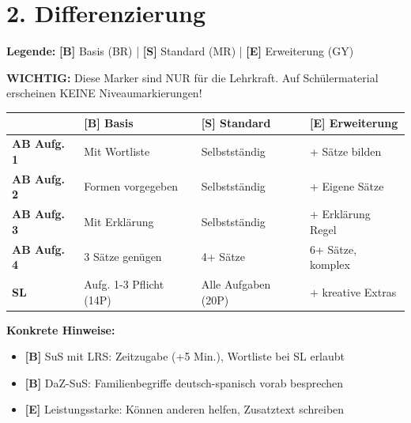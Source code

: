 \documentclass[11pt, a4paper]{article}
\newcommand{\B}{\textcolor{basis}{\textbf{[B]}}}
\newcommand{\Std}{\textcolor{standard}{\textbf{[S]}}}
\newcommand{\E}{\textcolor{erweiterung}{\textbf{[E]}}}
\begin{document}

\section*{2. Differenzierung}

\begin{differenzierung}
\textbf{Legende:} \B{} Basis (BR) | \Std{} Standard (MR) | \E{} Erweiterung (GY)

\vspace{0.5em}

\textbf{WICHTIG:} Diese Marker sind NUR für die Lehrkraft. Auf Schülermaterial erscheinen KEINE Niveaumarkierungen!
\end{differenzierung}

\vspace{1em}

\begin{tabularx}{\textwidth}{|l|X|X|X|}
\hline
& \B{} \textbf{Basis} & \Std{} \textbf{Standard} & \E{} \textbf{Erweiterung} \\
\hline
\textbf{AB Aufg. 1} & Mit Wortliste & Selbstständig & + Sätze bilden \\
\hline
\textbf{AB Aufg. 2} & Formen vorgegeben & Selbstständig & + Eigene Sätze \\
\hline
\textbf{AB Aufg. 3} & Mit Erklärung & Selbstständig & + Erklärung Regel \\
\hline
\textbf{AB Aufg. 4} & 3 Sätze genügen & 4+ Sätze & 6+ Sätze, komplex \\
\hline
\textbf{SL} & Aufg. 1-3 Pflicht (14P) & Alle Aufgaben (20P) & + kreative Extras \\
\hline
\end{tabularx}

\vspace{1em}

\textbf{Konkrete Hinweise:}
\begin{itemize}
    \item \B{} SuS mit LRS: Zeitzugabe (+5 Min.), Wortliste bei SL erlaubt
    \item \B{} DaZ-SuS: Familienbegriffe deutsch-spanisch vorab besprechen
    \item \E{} Leistungsstarke: Können anderen helfen, Zusatztext schreiben
\end{itemize}

\end{document}
